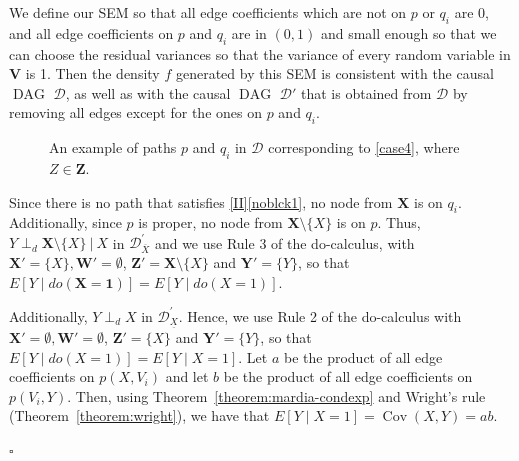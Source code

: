 \documentclass[11pt,a4paper]{article}
\newcommand\given[1][]{\:#1\vert\:}
\newcommand{\dsepp}{\perp_{d}}
\newenvironment{proofof}[1][]{\begin{trivlist}
   \item[\hskip \labelsep {\bfseries Proof of #1.}]}{\hfill{}$\square$\end{trivlist}}
\DeclareMathOperator{\Cov}{Cov}
\DeclareMathOperator{\DAG}{DAG}
\newcommand{\g}[1][G]{\mathcal{#1}}
\begin{document}
\begin{proofof}[Theorem~\ref{theorem:completeness ac}]
\begin{enumerate}[label=(\roman*)]
We define our SEM so that all edge coefficients which are not on $p$ or $q_i$ are $0$, and all edge coefficients on $p$ and $q_i$ are in $(0,1)$ and small enough so that we can choose the residual variances so that the variance of every random variable in $\mathbf{V}$ is 1. Then the density $f$ generated by this SEM is consistent with the causal $\DAG$ $\g[D]$, as well as with the causal $\DAG$ $\g[D']$ that is obtained from $\g[D]$ by removing all edges except for the ones on $p$ and $q_i$.
\begin{figure}
\centering
{}
\caption{An example of paths $p$ and $q_i$ in $\g[D]$ corresponding to \ref{case4}, where $Z \in \mathbf{Z}$.}
\label{fig:case4}
\end{figure}

Since there is no path that satisfies \ref{II}\ref{noblck1}, no node from $\mathbf{X}$ is on $q_i$. Additionally, since $p$ is proper, no node from $\mathbf{X} \setminus \{X\}$ is on $p$.
Thus, $Y \dsepp \mathbf{X}\setminus \{X\} \given X$ in $\g[D]^{'}_{\overline{X}}$ and we use Rule 3 of the do-calculus, with $\mathbf{X'} = \{X\}, \mathbf{W'} = \emptyset$, $\mathbf{Z'} = \mathbf{X}\setminus \{X\}$ and $ \mathbf{Y'} = \{Y\}$, so that $E[ Y \mid do(\mathbf{X}=\mathbf{1})]= E[ Y \mid do(X=1)]$.

Additionally, $Y \dsepp X $ in $\g[D]^{'}_{\underline{X}}$. Hence, we use Rule 2 of the do-calculus with $\mathbf{X'} = \emptyset, \mathbf{W'} = \emptyset$, $\mathbf{Z'} = \{X\}$ and $ \mathbf{Y'} = \{Y\}$, so that $E[ Y \mid do(X=1)]= E[ Y \mid X=1]$. Let $a$ be the product of all edge coefficients on $p(X,V_i)$ and let $b$ be the product of all edge coefficients on $p(V_i, Y)$. Then, using Theorem~\ref{theorem:mardia-condexp} and Wright's rule (Theorem~\ref{theorem:wright}), we have that $E[ Y \mid X=1] = \Cov(X,Y) = ab$.


\end{enumerate}
\end{proofof}
\end{document}
